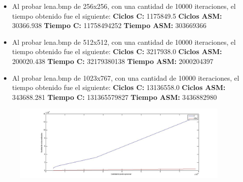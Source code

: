 \documentclass[10pt, a4paper]{article}
\begin{document}
\begin{itemize}
\begin{itemize}
\item{Al probar lena.bmp de 256x256, con una cantidad de 10000 iteraciones, el tiempo obtenido fue el siguiente:\newline
\newline
\textbf{Ciclos C:}                 1175849.5\newline
\vspace{0.15cm}
\textbf{Ciclos ASM:}               30366.938\newline
\textbf{Tiempo C:}                 11758494252\newline
\textbf{Tiempo ASM:}               303669366\newline}

\item{Al probar lena.bmp de 512x512, con una cantidad de 10000 iteraciones, el tiempo obtenido fue el siguiente:\newline
\newline
\textbf{Ciclos C:}                  3217938.0\newline
\vspace{0.15cm}
\textbf{Ciclos ASM:}               200020.438\newline
\textbf{Tiempo C:}                 32179380138\newline
\textbf{Tiempo ASM:}               2000204397\newline}

\item{Al probar lena.bmp de 1023x767, con una cantidad de 10000 iteraciones, el tiempo obtenido fue el siguiente:\newline
\newline
\textbf{Ciclos C:}                 13136558.0\newline
\vspace{0.15cm}
\textbf{Ciclos ASM:}               343688.281\newline
\textbf{Tiempo C:}                 131365579827\newline
\textbf{Tiempo ASM:}               3436882980\newline}

\end{itemize}

\begin{figure}[H] %
\begin{center}
\includegraphics[width=300pt]{./ciclosHalftone.jpg}
\end{center}
\end{figure}


\end{itemize}
\end{document}
